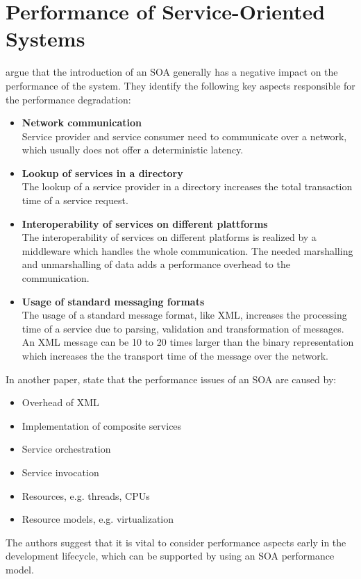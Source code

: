 \section{Performance of Service-Oriented Systems}
\citet{OBrien:2007fk} argue that the introduction of an SOA generally has a negative impact on the performance of the system. They identify the following key aspects responsible for the performance degradation:
\begin{itemize}
	\item \textbf{Network communication}\\
	Service provider and service consumer need to communicate over a network, which usually does not offer a deterministic latency.
	\item \textbf{Lookup of services in a directory}\\
	The lookup of a service provider in a directory increases the total transaction time of a service request.
	\item \textbf{Interoperability of services on different plattforms}\\
	The interoperability of services on different platforms is realized by a middleware which handles the whole communication. The needed marshalling and unmarshalling of data adds a performance overhead to the communication.
	\item \textbf{Usage of standard messaging formats}\\
	The usage of a standard message format, like XML, increases the processing time of a service due to parsing, validation and transformation of messages. An XML message can be 10 to 20 times larger than the binary representation which increases the the transport time of the message over the network.
\end{itemize}
In another paper, \citet{OBrien:2008uq} state that the performance issues of an SOA are caused by:
\begin{itemize}
	\item Overhead of XML
	\item Implementation of composite services
	\item Service orchestration
	\item Service invocation
	\item Resources, e.g. threads, CPUs
	\item Resource models, e.g. virtualization
\end{itemize}
The authors suggest that it is vital to consider performance aspects early in the development lifecycle, which can be supported by using an SOA performance model.

